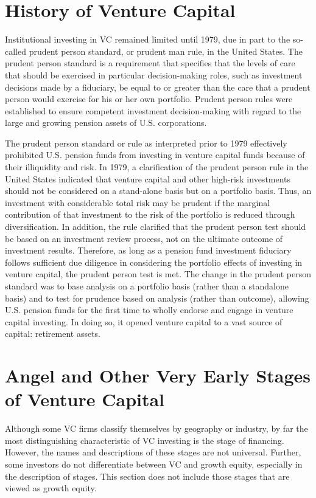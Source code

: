 \documentclass[11pt]{article}
\begin{document}
\section*{History of Venture Capital}
Institutional investing in VC remained limited until 1979, due in part to the so-called prudent person standard, or prudent man rule, in the United States. The prudent person standard is a requirement that specifies that the levels of care that should be exercised in particular decision-making roles, such as investment decisions made by a fiduciary, be equal to or greater than the care that a prudent person would exercise for his or her own portfolio. Prudent person rules were established to ensure competent investment decision-making with regard to the large and growing pension assets of U.S. corporations.

The prudent person standard or rule as interpreted prior to 1979 effectively prohibited U.S. pension funds from investing in venture capital funds because of their illiquidity and risk. In 1979, a clarification of the prudent person rule in the United States indicated that venture capital and other high-risk investments should not be considered on a stand-alone basis but on a portfolio basis. Thus, an investment with considerable total risk may be prudent if the marginal contribution of that investment to the risk of the portfolio is reduced through diversification. In addition, the rule clarified that the prudent person test should be based on an investment review process, not on the ultimate outcome of investment results. Therefore, as long as a pension fund investment fiduciary follows sufficient due diligence in considering the portfolio effects of investing in venture capital, the prudent person test is met. The change in the prudent person standard was to base analysis on a portfolio basis (rather than a standalone basis) and to test for prudence based on analysis (rather than outcome), allowing U.S. pension funds for the first time to wholly endorse and engage in venture capital investing. In doing so, it opened venture capital to a vast source of capital: retirement assets.

\section*{Angel and Other Very Early Stages of Venture Capital}
Although some VC firms classify themselves by geography or industry, by far the most distinguishing characteristic of VC investing is the stage of financing. However, the names and descriptions of these stages are not universal. Further, some investors do not differentiate between VC and growth equity, especially in the description of stages. This section does not include those stages that are viewed as growth equity.
\end{document}
